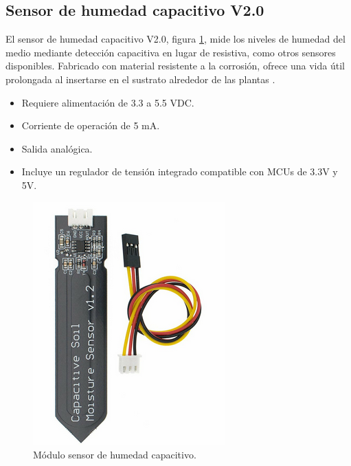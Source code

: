 


\subsection{Sensor de humedad capacitivo V2.0}

El sensor de humedad capacitivo V2.0, figura \ref{fig:moisture}, mide los niveles de humedad del medio mediante detección capacitiva en lugar de resistiva, como otros sensores disponibles. Fabricado con material resistente a la corrosión, ofrece una vida útil prolongada al insertarse en el sustrato alrededor de las plantas \cite{MOISTURE}.

\begin{itemize}
	\item Requiere alimentación de 3.3 a 5.5 VDC.
	\item Corriente de operación de 5 mA.
	\item Salida analógica.
	\item Incluye un regulador de tensión integrado compatible con MCUs de 3.3V y 5V.
\end{itemize}


\begin{figure}[h]
\centering
\includegraphics[scale=.5]{./Figures/moisture.png}
	\caption{Módulo sensor de humedad capacitivo\protect\footnotemark.}
	\label{fig:moisture}
\end{figure}



